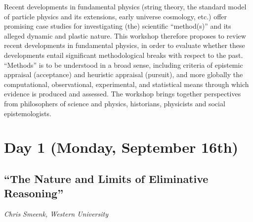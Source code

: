 \documentclass[11pt]{article}
\begin{document}
Recent developments in fundamental physics (string theory, the standard model of particle physics and its extensions, early universe cosmology, etc.) offer promising case studies for investigating (the) scientific “method(s)” and its alleged dynamic and plastic nature. This workshop therefore proposes to review recent developments in fundamental physics, in order to evaluate whether these developments entail significant methodological breaks with respect to the past. ``Methods'' is to be understood in a broad sense, including criteria of epistemic appraisal (acceptance) and heuristic appraisal (pursuit), and more globally the computational, observational, experimental, and statistical means through which evidence is produced and assessed. The workshop brings together perspectives from philosophers of science and physics, historians, physicists and social epistemologists.

\normalsize

\vfill

\tableofcontents

\newpage 




\newpage


\section*{\textsf{Day 1 (Monday, September 16th)}}
\vspace{3em}


\subsection*{\textsf{``The Nature and Limits of
Eliminative Reasoning''}}

\textcolor{moderncvgreen}{
\textit{Chris Smeenk, Western University
}
}

\ 
\end{document}
